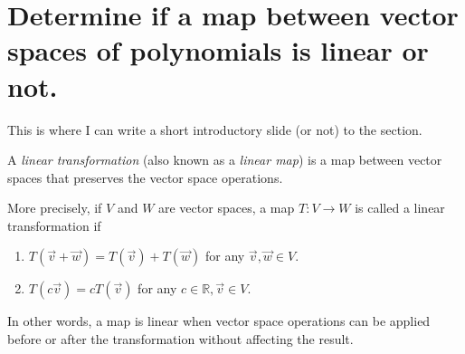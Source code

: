 \documentclass[10pt,]{book}
\theoremstyle{ptxplainnotitle}
\theoremstyle{ptxplaintitle}
\theoremstyle{ptxdefinitionnotitle}
\theoremstyle{ptxdefinitiontitle}
\theoremstyle{ptxdefinitionnotitle}
\theoremstyle{ptxdefinitiontitle}
\theoremstyle{ptxdefinitionnotitle}
\theoremstyle{ptxdefinitiontitle}
\theoremstyle{ptxdefinitionnotitle}
\theoremstyle{ptxdefinitiontitle}
\newcommand{\IR}{\mathbb{R}}
\begin{document}
\section[{Determine if a map between vector spaces of polynomials is linear or not.}]{Determine if a map between vector spaces of polynomials is linear or not.}\label{section-standard-A1}
\hypertarget{p-3}{}%
This is where I can write a short introductory slide (or not) to the section.%
\begin{definition}\label{definition-1}
\hypertarget{p-4}{}%
A \emph{linear transformation} (also known as a \emph{linear map}) is a map between vector spaces that preserves the vector space operations.%
\par
\hypertarget{p-5}{}%
More precisely, if \(V\) and \(W\) are vector spaces, a map \(T:V\rightarrow W\) is called a linear transformation if%
\leavevmode%
\begin{enumerate}
\item\hypertarget{li-1}{}\(T(\vec{v}+\vec{w}) = T(\vec{v})+T(\vec{w})\) for any \(\vec{v},\vec{w} \in V\).%
\item\hypertarget{li-2}{}\(T(c\vec{v}) = cT(\vec{v})\) for any \(c \in \IR,\vec{v} \in V\).%
\end{enumerate}
\hypertarget{p-6}{}%
In other words, a map is linear when vector space operations can be applied before or after the transformation without affecting the result.%
\end{definition}
\end{document}
